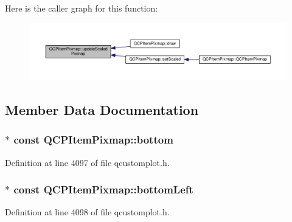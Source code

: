 Here is the caller graph for this function\+:\nopagebreak
\begin{figure}[H]
\begin{center}
\leavevmode
\includegraphics[width=350pt]{class_q_c_p_item_pixmap_a8bced3027b326b290726cd1979c7cfc6_icgraph}
\end{center}
\end{figure}




\subsection{Member Data Documentation}
\hypertarget{class_q_c_p_item_pixmap_ad7da77f530868e846151eff8a28fb948}{}
\subsubsection[{bottom}]{$\ast$ const Q\+C\+P\+Item\+Pixmap\+::bottom}\label{class_q_c_p_item_pixmap_ad7da77f530868e846151eff8a28fb948}


Definition at line 4097 of file qcustomplot.\+h.

\hypertarget{class_q_c_p_item_pixmap_a01943e569233382b3627e24636b0fff2}{}
\subsubsection[{bottom\+Left}]{$\ast$ const Q\+C\+P\+Item\+Pixmap\+::bottom\+Left}\label{class_q_c_p_item_pixmap_a01943e569233382b3627e24636b0fff2}


Definition at line 4098 of file qcustomplot.\+h.

\hypertarget{class_q_c_p_item_pixmap_abcc38063f9502b876bf6615c45cc0994}{}
